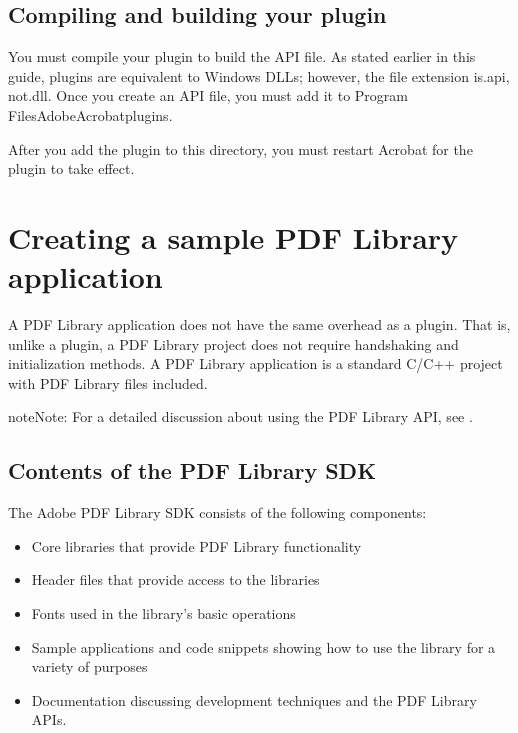 \documentclass[letterpaper,12pt,english,openany,oneside]{sphinxmanual}
\begin{document}
\subsection{Compiling and building your plugin}
\label{\detokenize{Plugins_CreatingSimplePlug:compiling-and-building-your-plugin}}
You must compile your plugin to build the API file. As stated earlier in this guide, plugins are equivalent to Windows DLLs; however, the file extension is.api, not.dll. Once you create an API file, you must add it to Program FilesAdobeAcrobatplugins.

After you add the plugin to this directory, you must restart Acrobat for the plugin to take effect.


\section{Creating a sample PDF Library application}
\label{\detokenize{Plugins_CreatingSimplePlug:creating-a-sample-pdf-library-application}}
A PDF Library application does not have the same overhead as a plugin. That is, unlike a plugin, a PDF Library project does not require handshaking and initialization methods. A PDF Library application is a standard C/C++ project with PDF Library files included.

\begin{sphinxadmonition}{note}{Note:}
For a detailed discussion about using the PDF Library API, see .
\end{sphinxadmonition}


\subsection{Contents of the PDF Library SDK}
\label{\detokenize{Plugins_CreatingSimplePlug:contents-of-the-pdf-library-sdk}}
The Adobe PDF Library SDK consists of the following components:
\begin{itemize}
\item {} 
Core libraries that provide PDF Library functionality

\item {} 
Header files that provide access to the libraries

\item {} 
Fonts used in the library’s basic operations

\item {} 
Sample applications and code snippets showing how to use the library for a variety of purposes

\item {} 
Documentation discussing development techniques and the PDF Library APIs.

\end{itemize}
\end{document}
